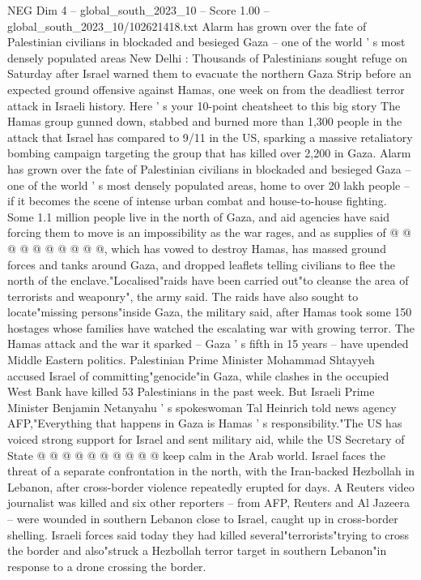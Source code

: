 \begin{textsample}{NEG Dim 4 – global\_south\_2023\_10 – Score 1.00 – global\_south\_2023\_10/102621418.txt}  \label{ex:f4_neg_027}
Alarm has grown over the fate of Palestinian civilians in blockaded and besieged Gaza -- one of the world ' s most densely populated areas New Delhi : Thousands of Palestinians sought refuge on Saturday after Israel warned them to evacuate the northern Gaza Strip before an expected ground offensive against Hamas, one week on from the deadliest terror attack in Israeli history.
Here ' s your 10-point cheatsheet to this big story The Hamas group gunned down, stabbed and burned more than 1,300 people in the attack that Israel has compared to 9/11 in the US, sparking a massive retaliatory bombing campaign targeting the group that has killed over 2,200 in Gaza.
Alarm has grown over the fate of Palestinian civilians in blockaded and besieged Gaza -- one of the world ' s most densely populated areas, home to over 20 lakh people -- if it becomes the scene of intense urban combat and house-to-house fighting.
Some 1.1 million people live in the north of Gaza, and aid agencies have said forcing them to move is an impossibility as the war rages, and as supplies of @ @ @ @ @ @ @ @ @ @, which has vowed to destroy Hamas, has massed ground forces and tanks around Gaza, and dropped leaflets telling civilians to flee the north of the enclave."Localised"raids have been carried out"to cleanse the area of terrorists and weaponry", the army said.
The raids have also sought to locate"missing persons"inside Gaza, the military said, after Hamas took some 150 hostages whose families have watched the escalating war with growing terror.
The Hamas attack and the war it sparked -- Gaza ' s fifth in 15 years -- have upended Middle Eastern politics.
Palestinian Prime Minister Mohammad Shtayyeh accused Israel of committing"genocide"in Gaza, while clashes in the occupied West Bank have killed 53 Palestinians in the past week.
But Israeli Prime Minister Benjamin Netanyahu ' s spokeswoman Tal Heinrich told news agency AFP,"Everything that happens in Gaza is Hamas ' s responsibility."The US has voiced strong support for Israel and sent military aid, while the US Secretary of State @ @ @ @ @ @ @ @ @ @ keep calm in the Arab world.
Israel faces the threat of a separate confrontation in the north, with the Iran-backed Hezbollah in Lebanon, after cross-border violence repeatedly erupted for days.
A Reuters video journalist was killed and six other reporters -- from AFP, Reuters and Al Jazeera -- were wounded in southern Lebanon close to Israel, caught up in cross-border shelling.
Israeli forces said today they had killed several"terrorists"trying to cross the border and also"struck a Hezbollah terror target in southern Lebanon"in response to a drone crossing the border.

\end{textsample}
